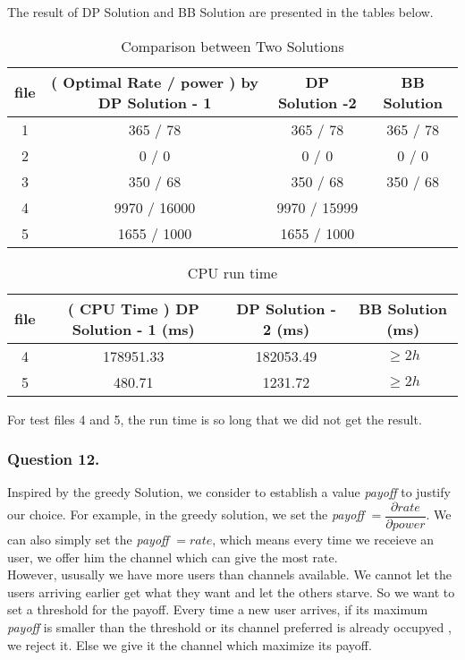 \documentclass[11pt, oneside]{report}
\begin{document}
The result of DP Solution and BB Solution are presented in the tables below.

\begin{table}[!htbp]
\centering
\begin{tabular}{|c|c|c|c|}%
\hline
file & ( Optimal Rate / power ) by DP Solution - 1 & DP Solution -2 &   BB Solution \\
\hline
1 & 365 / 78  & 365 / 78 & 365 / 78 \\
\hline
2 & 0 / 0 & 0 / 0 & 0 / 0\\
\hline
3 & 350 / 68 & 350 / 68 & 350 / 68 \\
\hline
4 & 9970 / 16000 & 9970 / 15999 & \\
\hline
5 & 1655 / 1000 & 1655 / 1000 & \\
\hline
\end{tabular}
\caption{Comparison between Two Solutions}
\end{table}

\begin{table}[!htbp]
\centering
\begin{tabular}{|c|c|c|c|}%
\hline
file & ( CPU Time ) DP Solution - 1 (ms) & DP Solution - 2 (ms) & BB Solution (ms) \\
\hline
4 &  178951.33 & 182053.49 & $\ge 2h$ \\
\hline
5 & 480.71 & 1231.72 & $\ge 2h$\\
\hline
\end{tabular}
\caption{CPU run time}
\end{table}

For test files 4 and 5, the run time is so long that we did not get the result.

\subsubsection{Question 12. }
Inspired by the greedy Solution, we consider to establish a value \textit{payoff} to justify our choice. For example, in the greedy solution, we set the \textit{payoff} $ = \dfrac{\partial rate}{\partial power}$. We can also simply set the \textit{payoff} $ = rate$, which means every time we receieve an user, we offer him the channel which can give the most rate. \\

However, ususally we have more users than channels available. We cannot let the users arriving earlier get what they want and let the others starve. So we want to set a threshold for the payoff. Every time a new user arrives, if its maximum \textit{payoff} is smaller than the threshold or its channel preferred is already occupyed , we reject it. Else we give it the channel which maximize its payoff. \\
\end{document}
